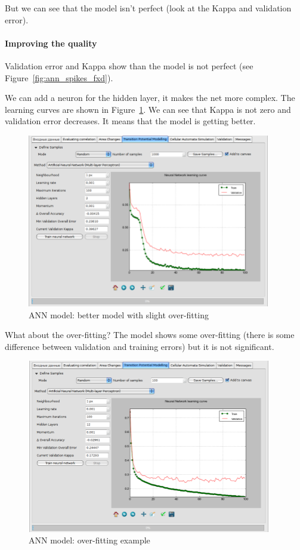 \documentclass{report}
\begin{document}
But we can see that the model isn't perfect (look at the Kappa and validation error).

\paragraph{Improving the quality} Validation error and Kappa show than the model is not perfect (see Figure~\ref{fig:ann_spikes_fxd}).

We can add a neuron for the hidden layer, it makes the net more complex. The learning curves are shown in Figure~\ref{fig:ann_2neurons}.
We can see that Kappa is not zero and validation error decreases. It means that the model is getting better. 

\begin{figure}[h!]
\centering
\includegraphics[width=0.95\textwidth]{img/ann_2neurons.png}
\caption{ANN model: better model with slight over-fitting}
\label{fig:ann_2neurons}
\end{figure}

What about the over-fitting? The model shows some over-fitting (there is some difference between validation and training errors) but it is not significant.

\begin{figure}[h!]
\centering
\includegraphics[width=0.95\textwidth]{img/ann_overfitting.png}
\caption{ANN model: over-fitting example}
\label{fig:ann_overfitting}
\end{figure}
\end{document}
